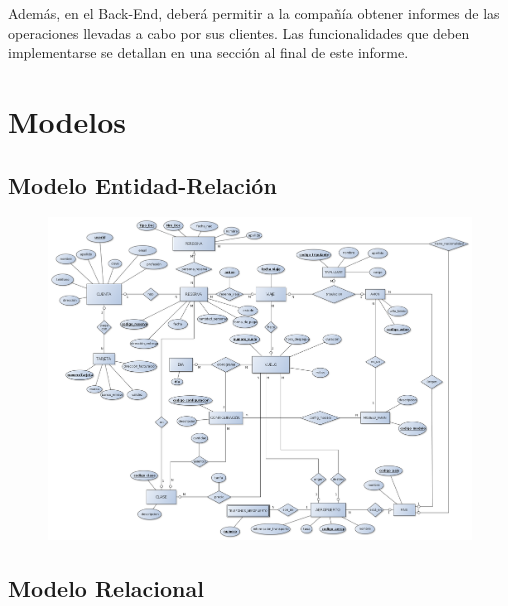 \documentclass[a4paper,10pt]{article}
\begin{document}
 
 Además, en el Back-End, deberá permitir a la compañía obtener informes de las operaciones llevadas a
cabo por sus clientes. Las funcionalidades que deben implementarse se detallan en una sección al final de este informe.


 \newpage

\section{Modelos}

\subsection{Modelo Entidad-Relaci\'on}



\begin{figure}[h!]
\centering
    \includegraphics[angle=90, scale=.38]{DER.png}
\end{figure}

\newpage

\subsection{Modelo Relacional}
\end{document}
